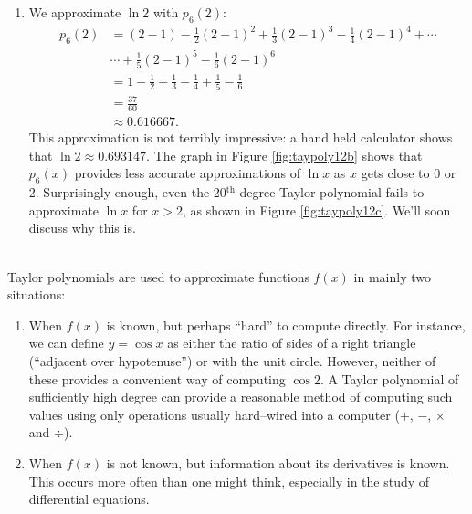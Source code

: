 {\begin{enumerate}
\begin{align*}
p_6(1.5) &= (1.5-1)-\frac12(1.5-1)^2+\frac13(1.5-1)^3-\frac14(1.5-1)^4+\cdots \\
			&\cdots +\frac15(1.5-1)^5-\frac16(1.5-1)^6\\
	&=\frac{259}{640}\\
	&\approx 0.404688.
\end{align*}
\normalsize
This is a good approximation as a calculator shows that $\ln 1.5 \approx 0.4055.$ Figure \ref{fig:taypoly12b} plots $y=\ln x$ with $y=p_6(x)$. We can see that $\ln 1.5\approx p_6(1.5)$.

\item	
We approximate $\ln 2$ with $ p_6(2)$:
\begin{align*}
p_6(2) &= (2-1)-\frac12(2-1)^2+\frac13(2-1)^3-\frac14(2-1)^4+\cdots \\
			&\cdots +\frac15(2-1)^5-\frac16(2-1)^6\\
			&=	1-\frac12+\frac13-\frac14+\frac15-\frac16 \\
			&= \frac{37}{60}\\ 
			&\approx 0.616667.
\end{align*}
This approximation is not terribly impressive: a hand held calculator shows that $\ln 2 \approx 0.693147.$ The graph in Figure \ref{fig:taypoly12b} shows that $p_6(x)$ provides less accurate approximations of $\ln x$ as $x$ gets close to 0 or 2. 
\drawexampleline
Surprisingly enough, even the 20$^\text{th}$ degree Taylor polynomial fails to approximate $\ln x$ for $x>2$, as shown in Figure \ref{fig:taypoly12c}. We'll soon discuss why this is.
\end{enumerate}
\baselineskip
}\\

Taylor polynomials are used to approximate functions $f(x)$ in mainly two situations:
	\begin{enumerate}
	\item		When $f(x)$ is known, but perhaps ``hard'' to compute directly. For instance, we can define $y=\cos x$ as either the ratio of sides of a right triangle (``adjacent over hypotenuse'') or with the unit circle. However, neither of these provides a convenient way of computing $\cos 2$. A Taylor polynomial of sufficiently high degree can provide a reasonable method of computing such values using only operations usually hard--wired into a computer ($+$, $-$, $\times$ and $\div$).
	
	\item		When $f(x)$ is not known, but information about its derivatives is known. This occurs more often than one might think, especially in the study of differential equations.
	\end{enumerate}

